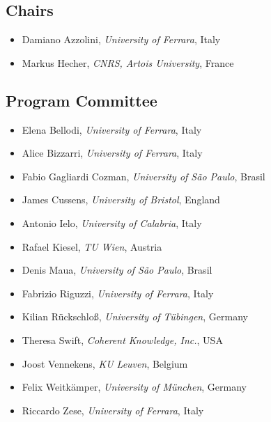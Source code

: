 \documentclass[
]{ceurart}
\begin{document}

\subsection*{Chairs}
\begin{itemize}
  \item Damiano Azzolini, \emph{University of Ferrara}, Italy
  \item Markus Hecher, \emph{CNRS, Artois University}, France
\end{itemize}


\subsection*{Program Committee}
\begin{itemize}
  \item Elena Bellodi, \emph{University of Ferrara}, Italy
  \item Alice Bizzarri, \emph{University of Ferrara}, Italy
  \item Fabio Gagliardi Cozman, \emph{University of São Paulo}, Brasil
  \item James Cussens, \emph{University of Bristol}, England
  \item Antonio Ielo, \emph{University of Calabria}, Italy
  \item Rafael Kiesel, \emph{TU Wien}, Austria
  \item Denis Maua, \emph{University of São Paulo}, Brasil
  \item Fabrizio Riguzzi, \emph{University of Ferrara}, Italy
  \item Kilian Rückschloß, \emph{University of Tübingen}, Germany
  \item Theresa Swift, \emph{Coherent Knowledge, Inc.}, USA
  \item Joost Vennekens, \emph{KU Leuven}, Belgium
  \item Felix Weitkämper, \emph{University of München}, Germany
  \item Riccardo Zese, \emph{University of Ferrara}, Italy
\end{itemize}


\end{document}
